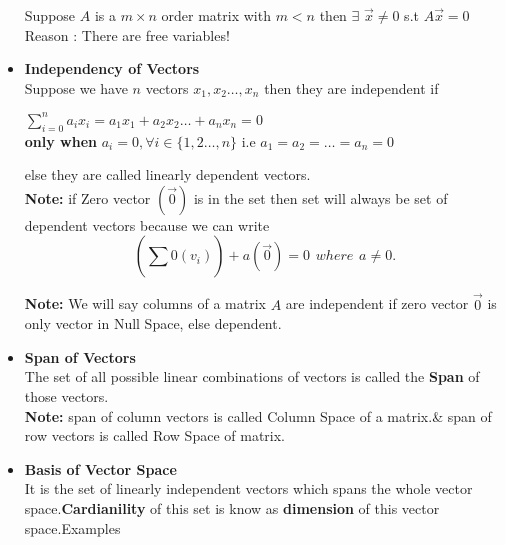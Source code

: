 \documentclass[a4paper,11pt]{article}
\numberwithin{equation}{section}
\begin{document}
\begin{itemize}
Suppose $A$ is a $m \times n$ order matrix with $m<n$ then $\exists$ $\vec{x}\neq 0$ s.t $A\vec{x}=0$\\
Reason : There are free variables!

\item \textbf{Independency of Vectors}\\
Suppose we have $n$ vectors $x_1,x_2\dots,x_n$ then they are independent if
\begin{center}
    $\sum_{i=0}^{n}a_ix_i=a_1x_1+a_2x_2\dots+a_nx_n=0$\\
    \vspace{5pt}
    \textbf {only when} $a_i=0, \forall i \in \{1,2\dots,n\}$ i.e $a_1=a_2=\dots=a_n=0$
\end{center}

else they are called linearly dependent vectors.\\

\textbf{Note: }if Zero vector $(\vec{0})$ is in the set then set will always be set of dependent vectors because we can write
\begin{equation}
    \left(\sum_{}^{}0(v_i)\right)+a(\vec{0})=0 \hspace{5pt}where\hspace{5pt}a\neq 0.
\end{equation}

\textbf{Note: }We will say columns of a matrix $A$ are independent if zero vector $\vec{0}$ is only vector in Null Space, else dependent.

\item \textbf{Span of Vectors}\\
The set of all possible linear combinations of vectors is called the \textbf{Span} of those vectors.\\
\textbf{Note: }span of column vectors is called Column Space of a matrix.\& span of row vectors is called Row Space of matrix.\\

\item \textbf{Basis of Vector Space} \\
It is the set of linearly independent vectors which spans the whole vector space.\textbf{Cardianility} of this set is know as \textbf{dimension} of this vector space.Examples


\end{itemize}
\end{document}
